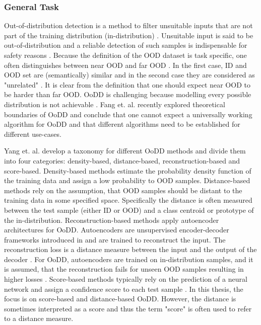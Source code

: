 \subsubsection{General Task}
Out-of-distribution detection is a method to filter unsuitable inputs that are not part of the training distribution (in-distribution) \citep{Yang2021}.
Unsuitable input is said to be out-of-distribution and a reliable detection of such samples is indispensable for safety reasons \citep{Yang2021}.
Because the definition of the OOD dataset is task specific, one often distinguishes between near OOD and far OOD \citep{Winkens2020}.
In the first case, ID and OOD set are (semantically) similar and in the second case they are considered as "unrelated" \citep{Winkens2020}.
It is clear from the definition that one should expect near OOD to be harder than far OOD.
OoDD is challenging because modelling every possible distribution is not achievable \citep{Salehi2022}.
Fang et. al. \citep{Fang2023} recently explored theoretical boundaries of OoDD and conclude that one cannot expect a universally working algorithm for OoDD and that different algorithms need to be established for different use-cases.
\par
Yang et. al. \citep{Yang2021} develop a taxonomy for different OoDD methods and divide them into four categories: density-based, distance-based, reconstruction-based and score-based.
Density-based methods estimate the probability density function of the training data and assign a low probability to OOD samples.
Distance-based methods rely on the assumption, that OOD samples should be distant to the training data in some specified space.
Specifically the distance is often measured between the test sample (either ID or OOD) and a class centroid or prototype of the in-distribution.
Reconstruction-based methods apply autoencoder architectures for OoDD.
Autoencoders are unsupervised encoder-decoder frameworks introduced in \citep{Rumelhart1986} and are trained to reconstruct the input.
The reconstruction loss is a distance measure between the input and the output of the decoder \citep{Baldi2012, Bank2020}.
For OoDD, autoencoders are trained on in-distribution samples, and it is assumed, that the reconstruction fails for unseen OOD samples resulting in higher losses \citep{Denouden2018}.
Score-based methods typically rely on the prediction of a neural network and assign a confidence score to each test sample \citep{Yang2021}.
In this thesis, the focus is on score-based and distance-based OoDD.
However, the distance is sometimes interpreted as a score and thus the term "score" is often used to refer to a distance measure.
